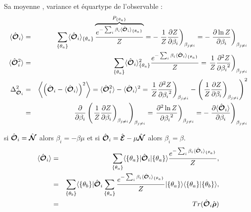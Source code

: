 	\begin{aff}
	Sa  moyenne , variance et équartype de l'observable :
	\begin{eqnarray}
		\langle\hat{\bm{\mathcal{O}}}_i \rangle & = & \sum_{\{\theta_a \}} 	\langle \hat{\bm{\mathcal{O}}}_i \rangle_{\{\theta_a \}} \overbrace{\frac{e^{-\sum_i \beta_i \langle \hat{\bm{\mathcal{O}}}_i \rangle_{\{\theta_a \}} }}{Z}}^{P_{\{\theta_a \}}} = - \left .\frac{1}{Z}\frac{ \partial Z }{ \partial \beta_i } \right )_{\beta_{j\neq i}} =  - \left .\frac{ \partial \ln Z }{ \partial \beta_i }  \right )_{\beta_{j\neq i}}\\
		\langle\hat{\bm{\mathcal{O}}}_i^2 \rangle & = & \sum_{\{\theta_a \} } 	\langle \hat{\bm{\mathcal{O}}}_i \rangle_{\{\theta_a \}}^2 \frac{e^{-\sum_i \beta_i \langle \hat{\bm{\mathcal{O}}}_i \rangle_{\{\theta_a \}} }}{Z} = \left . \frac{1}{Z} \frac{ \partial^2 Z }{ {\partial \beta_i}^2 }  \right )_{\beta_{j\neq i}} \notag \\
		\Delta_{\hat{\bm{\mathcal{O}}}_i}^2  & = & 	\left \langle \left (\hat{\bm{\mathcal{O}}}_i - \langle\hat{\bm{\mathcal{O}}}_i \rangle \right )^2  \right \rangle  = 	\langle\hat{\bm{\mathcal{O}}}_i^2 \rangle  -  \langle\hat{\bm{\mathcal{O}}}_i \rangle^2 = \left . \frac{1}{Z} \frac{ \partial^2 Z }{ {\partial \beta_i}^2 }  \right )_{\beta_{j\neq i}} - \left ( \left . \frac{1}{Z}\frac{ \partial Z }{ \partial \beta_i }  \right )_{\beta_{j\neq i}}\right )^2  \\
		& = & \frac{\partial}{\partial \beta_i } \left ( \left . \frac{1}{Z} \frac{\partial Z}{\partial \beta_i }  \right )_{\beta_{j\neq i}}  \right )_{\beta_{j\neq i}} =  \left . \frac{\partial^2 \ln Z  }{{\partial \beta_i}^2 }  \right )_{\beta_{j\neq i}}  = - \left . 	\frac{\partial \langle\hat{\bm{\mathcal{O}}}_i \rangle }{\partial \beta_i } \right )_{\beta_{j\neq i}}
	\end{eqnarray}
	\end{aff}
	
	si $\hat{\bm{\mathcal{O}}}_i = \hat{\bm{\mathcal{N}}}$ alors $\beta_i = - \beta \mu $ et si $\hat{\bm{\mathcal{O}}}_i = \hat{\bm{\mathcal{E}}} - \mu \hat{\bm{\mathcal{N}}} $ alors $\beta_i = \beta$.\\
	
		
	\begin{eqnarray}
		\langle\hat{\bm{\mathcal{O}}}_i \rangle & = & 	\sum_{\{\theta_a \} } 	\langle \{\theta_a \}  \vert \hat{\bm{\mathcal{O}}}_i \vert \{\theta_a \}  \rangle \frac{e^{-\sum_i \beta_i \langle \hat{\bm{\mathcal{O}}}_i \rangle_{\{\theta_a \}} }}{Z},\\
		& = & 	\sum_{\{\theta_b \}} \langle \{\theta_b \}  \vert  \hat{\bm{\mathcal{O}}}_i \sum_{\{\theta_a \}}\frac{e^{-\sum_i \beta_i \langle \hat{\bm{\mathcal{O}}}_i \rangle_{\{\theta_a \} } }}{Z} \vert \{\theta_a \}  \rangle  	\langle \{\theta_a \}  \vert  \{\theta_b \}  \rangle ,\\
		& = & Tr (  \hat{\bm{\mathcal{O}}}_i \hat{\bm{\rho}}) 
	\end{eqnarray}
	
